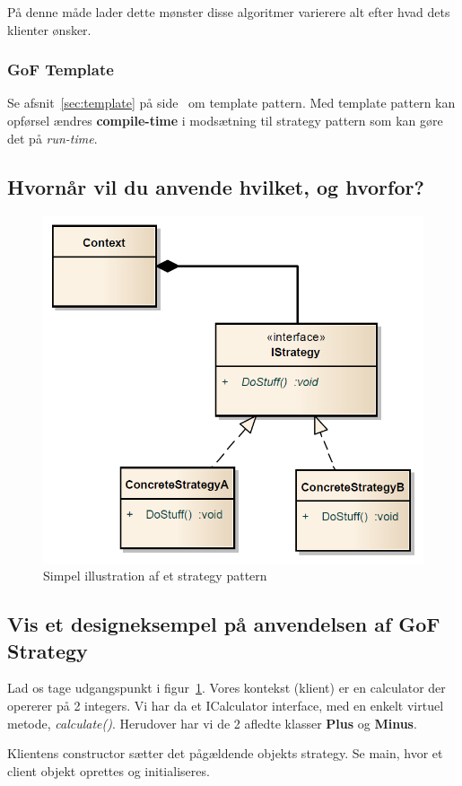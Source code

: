 På denne måde lader dette mønster disse algoritmer varierere alt efter hvad dets klienter ønsker.

\subsubsection{GoF Template}
Se afsnit~\ref{sec:template} på side~\pageref{sec:template} om template pattern. Med template pattern kan opførsel ændres \textbf{compile-time} i modsætning til strategy pattern som kan gøre det på \textit{run-time}.

\subsection{Hvornår vil du anvende hvilket, og hvorfor?}
\derp

\begin{figure}[h]
	\centering
	\includegraphics[width=0.6\linewidth]{figs/strategyPattern.PNG}
	\caption[UML for et strategy pattern]{Simpel illustration af et strategy pattern}
	\label{fig:strategyPattern}
\end{figure}

\subsection{Vis et designeksempel på anvendelsen af GoF Strategy}

Lad os tage udgangspunkt i figur~\ref{fig:strategyPattern}. Vores kontekst (klient) er en calculator der opererer på 2 integers.
Vi har da et ICalculator interface, med en enkelt virtuel metode, \textit{calculate()}.
Herudover har vi de 2 afledte klasser \textbf{Plus} og \textbf{Minus}.

Klientens constructor sætter det pågældende objekts strategy. Se main, hvor et client objekt oprettes og initialiseres.

